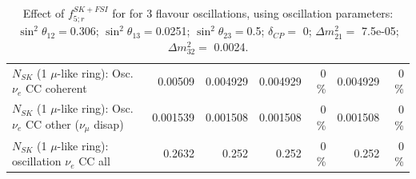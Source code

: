 \begin{table}
\begin{tabular}{| l | r | r | r  r | r  r |}
                          $N_{SK}$ (1 $\mu$-like ring): Osc. $\nu_e$ CC coherent &         0.00509 &        0.004929 &        0.004929 &        0 \%  &        0.004929 &        0 \%  \\ 
           $N_{SK}$ (1 $\mu$-like ring): Osc. $\nu_e$ CC other ($\nu_\mu$ disap) &        0.001539 &        0.001508 &        0.001508 &        0 \%  &        0.001508 &        0 \%  \\ 
                        $N_{SK}$ (1 $\mu$-like ring): oscillation $\nu_e$ CC all &          0.2632 &           0.252 &           0.252 &        0 \%  &           0.252 &        0 \%  \\ 
\hline
\hline
\end{tabular}
\caption{ Effect of $f_{5; r}^{SK+FSI}$ for for 3 flavour oscillations, using oscillation parameters:  $\sin^2\theta_{12} = $0.306; $\sin^2\theta_{13} = $0.0251; $\sin^2\theta_{23} = $0.5; $\delta_{CP} = $        0; $\Delta m^2_{21} = $    7.5e-05; $\Delta m^2_{32} = $    0.0024. }
\label{tab:num_skdetfsi_005_1RmuT_3f_osc_t13:0.0251_spectralreco_spectraltrue}
\end{table}
\clearpage
